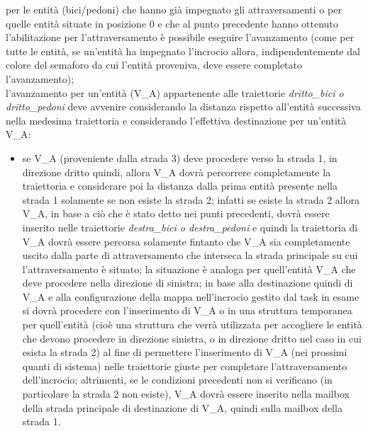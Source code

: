 \begin{enumerate}
\begin{enumerate}
per le entità (bici/pedoni) che hanno già impegnato gli attraversamenti o per quelle entità situate in posizione 0 e che al punto precedente hanno ottenuto l'abilitazione per l'attraversamento è possibile eseguire l'avanzamento (come per tutte le entità, se un'entità ha impegnato l'incrocio allora, indipendentemente dal colore del semaforo da cui l'entità proveniva, deve essere completato l'avanzamento); \\
l'avanzamento per un'entità (V\_A) appartenente alle traiettorie \textit{drit\-to\_bi\-ci o drit\-to\_pe\-do\-ni} deve avvenire considerando la distanza rispetto all'entità successiva nella medesima traiettoria e considerando l'effettiva destinazione per un'entità V\_A:
\begin{itemize}
\item se V\_A (proveniente dalla strada 3) deve procedere verso la strada 1, in direzione dritto quindi, allora V\_A dovrà percorrere completamente la traiettoria e considerare poi la distanza dalla prima entità presente nella strada 1 solamente se non esiste la strada 2; infatti se esiste la strada 2 allora V\_A, in base a ciò che è stato detto nei punti precedenti, dovrà essere inserito nelle traiettorie \textit{des\-tra\_bi\-ci o des\-tra\_pe\-do\-ni} e quindi la traiettoria di V\_A dovrà essere percorsa solamente fintanto che V\_A sia completamente uscito dalla parte di attraversamento che interseca la strada principale su cui l'attraversamento è situato; la situazione è analoga per quell'entità V\_A che deve procedere nella direzione di sinistra; in base alla destinazione quindi di V\_A e alla configurazione della mappa nell'incrocio gestito dal task in esame si dovrà procedere con l'inserimento di V\_A o in una struttura temporanea per quell'entità (cioè una struttura che verrà utilizzata per accogliere le entità che devono procedere in direzione sinistra, o in direzione dritto nel caso in cui esista la strada 2) al fine di permettere l'inserimento di V\_A (nei prossimi quanti di sistema) nelle traiettorie giuste per completare l'attraversamento dell'incrocio; altrimenti, se le condizioni precedenti non si verificano (in particolare la strada 2 non esiste), V\_A dovrà essere inserito nella mailbox della strada principale di destinazione di V\_A, quindi sulla mailbox della strada 1.
\end{itemize}
\end{enumerate}
\end{enumerate}

